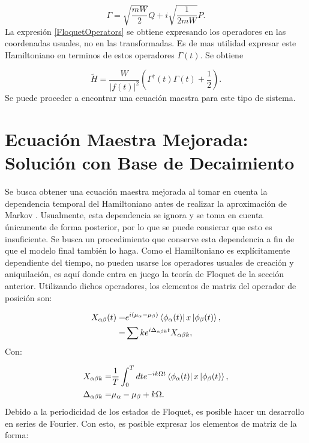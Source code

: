 \documentclass[a4paper,10pt]{report}
\begin{document}
\begin{equation}
\Gamma = \sqrt{\frac{mW}{2}}Q + i \sqrt{\frac{1}{2mW}}P.
\end{equation} La expresión \ref{FloquetOperators} se obtiene expresando los operadores en las coordenadas usuales, no en las transformadas. Es de mas utilidad expresar este Hamiltoniano en terminos de estos operadores $\Gamma(t)$. Se obtiene

\begin{equation}
\tilde{H} = \frac{W}{|f(t)|^2}(\Gamma^\dagger(t)\Gamma(t) + \frac{1}{2}).
\end{equation} Se puede proceder a encontrar una ecuación maestra para este tipo de sistema.

\section{Ecuación Maestra Mejorada: Solución con Base de Decaimiento}

Se busca obtener una ecuación maestra mejorada al tomar en cuenta la dependencia temporal del Hamiltoniano antes de realizar la aproximación de Markov \cite{HanngiDQS}. Usualmente, esta dependencia se ignora y se toma en cuenta únicamente de forma posterior, por lo que se puede consierar que esto es insuficiente. Se busca un procedimiento que conserve esta dependencia a fin de que el modelo final también lo haga. Como el Hamiltoniano es explícitamente dependiente del tiempo, no pueden usarse los operadores usuales de creación y aniquilación, es aquí donde entra en juego la teoría de Floquet de la sección anterior. Utilizando dichos operadores, los elementos de matriz del operador de posición son:

\begin{align}
X_{\alpha \beta}(t) =& e^{i(\mu_{\alpha}-\mu_{\beta})}\Bra{\phi_{\alpha}(t)}x\Ket{\phi_{\beta}(t)},\\
=& \sum{k} e^{i\Delta_{\alpha\beta k}t} X_{\alpha\beta k},
\end{align}Con:

\begin{align*}
X_{\alpha\beta k} =& \frac{1}{T} \int_0^T dt e^{-ik\Omega t}\Bra{\phi_{\alpha}(t)}x\Ket{\phi_{\beta}(t)}, \\
\Delta_{\alpha \beta k} =& \mu_{\alpha}-\mu_{\beta} + k\Omega.
\end{align*}Debido a la periodicidad de los estados de Floquet, es posible hacer un desarrollo en series de Fourier. Con esto, es posible expresar los elementos de matriz de la forma:
\end{document}
